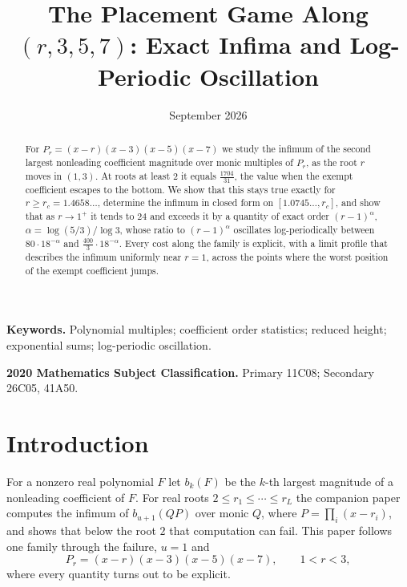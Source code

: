 \documentclass[11pt]{article}
\title{The Placement Game Along $(r,3,5,7)$: Exact Infima and Log-Periodic Oscillation}
\author{\shortstack{Bangyen Pham\\
\small Independent Researcher\\
\small\href{mailto:bangyenp@gmail.com}{\texttt{bangyenp@gmail.com}}\\
\small\href{https://orcid.org/0009-0006-9928-2088}{ORCID: 0009-0006-9928-2088}}}
\date{September 2026}
\begin{document}
\maketitle

\begin{abstract}
For $P_r=(x-r)(x-3)(x-5)(x-7)$ we study the infimum of the second largest
nonleading coefficient magnitude over monic multiples of $P_r$, as the
root $r$ moves in $(1,3)$.  At roots at least $2$ it equals
$\tfrac{1704}{31}$, the value when the exempt coefficient escapes to the
bottom.  We show that this stays true exactly for $r\ge r_c=1.4658\ldots$,
determine the infimum in closed form on $[1.0745\ldots,r_c]$, and show that
as $r\to1^+$ it tends to $24$ and exceeds it by a quantity of exact order
$(r-1)^\alpha$, $\alpha=\log(5/3)/\log3$, whose ratio to $(r-1)^\alpha$
oscillates log-periodically between $80\cdot18^{-\alpha}$ and
$\tfrac{400}3\cdot18^{-\alpha}$.  Every cost along the family is explicit,
with a limit profile that describes the infimum uniformly near $r=1$,
across the points where the worst position of the exempt coefficient
jumps.
\end{abstract}

\noindent\textbf{Keywords.} Polynomial multiples; coefficient order
statistics; reduced height; exponential sums; log-periodic oscillation.

\noindent\textbf{2020 Mathematics Subject Classification.} Primary 11C08; Secondary 26C05, 41A50.

\section{Introduction}\label{sec:intro}

For a nonzero real polynomial $F$ let $b_k(F)$ be the $k$-th largest
magnitude of a nonleading coefficient of $F$.  For real roots
$2\le r_1\le\cdots\le r_L$ the companion paper~\cite{coefficient-mass-attainment}
computes the infimum of $b_{u+1}(QP)$ over monic $Q$, where
$P=\prod_i(x-r_i)$, and shows that below the root $2$ that computation can
fail.  This paper follows one family through the failure, $u=1$ and
\[
  P_r=(x-r)(x-3)(x-5)(x-7),\qquad 1<r<3,
\]
where every quantity turns out to be explicit.
\end{document}
